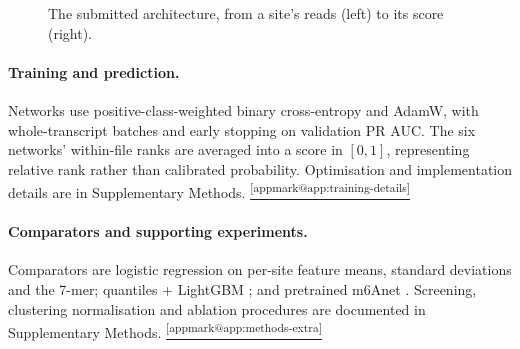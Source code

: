 \documentclass[11pt,a4paper]{article}
\makeatletter
\DeclareRobustCommand{\applink}[1]{%
    \hyperref[#1]{\textsuperscript{\ref*{appmark@#1}}}}
\makeatother
\begin{document}
\begin{figure}[H]
{}
    \caption{The submitted architecture, from a site's reads (left) to its
    score (right).}
    \label{fig:model_pipeline}
\end{figure}

\paragraph{Training and prediction.}
Networks use positive-class-weighted binary cross-entropy and AdamW, with
whole-transcript batches and early stopping on validation PR AUC. The six
networks' within-file ranks are averaged into a score in $[0,1]$, representing
relative rank rather than calibrated probability. Optimisation and
implementation details are in Supplementary Methods.\applink{app:training-details}

\paragraph{Comparators and supporting experiments.}
Comparators are logistic regression on per-site feature means, standard
deviations and the 7-mer; quantiles + LightGBM \citep{ke2017}; and pretrained
m6Anet \citep{hendra2022}. Screening, clustering normalisation and ablation
procedures are documented in Supplementary Methods.\applink{app:methods-extra}
\end{document}
